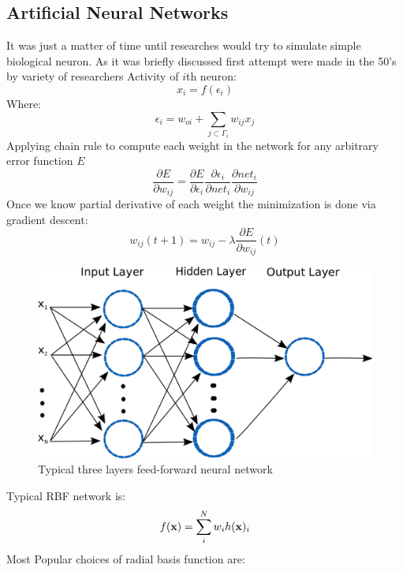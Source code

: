 \subsection{Artificial Neural Networks}
It was just a matter of time until researches would try to simulate simple biological neuron. As it was briefly discussed first attempt were made in the 50's by variety of researchers 
Activity of $i$th neuron:
\begin{equation}\label{eq:n1}
x_i=f(\epsilon_{i})
\end{equation}
Where: 
\begin{equation}\label{eq:n2}
\epsilon_{i}=w_{oi}+\sum_{j\subset\Gamma_i}w_{ij}x_j
\end{equation}
Applying chain rule to compute each weight in the network for any arbitrary error function $E$
\begin{equation}\label{eq:n3}
\frac{\partial E}{\partial w_{ij}}=\frac{\partial E}{\partial \epsilon_{i}}\frac{\partial \epsilon_{i}}{\partial net_{i}}\frac{\partial net_i}{\partial w_{ij}}
\end{equation}
Once we know partial derivative of each weight the minimization is done via gradient descent:
\begin{equation}\label{eq:n4}
w_{ij}(t+1)=w_{ij}-\lambda\frac{\partial E}{\partial w_{ij}}(t)
\end{equation}
\begin{figure}[h!]
\centering
\includegraphics[width=1\textwidth]{figures/chap3/mlp.png}
\caption{Typical three layers feed-forward neural network}
\label{figure:mlp}
\end{figure}
Typical RBF network is: 
\begin{equation}\label{eq:rbf1}
f(\bold x)=\sum_{i}^Nw_ih(\bold x)_i
\end{equation}
Most Popular choices of radial basis function are: 
